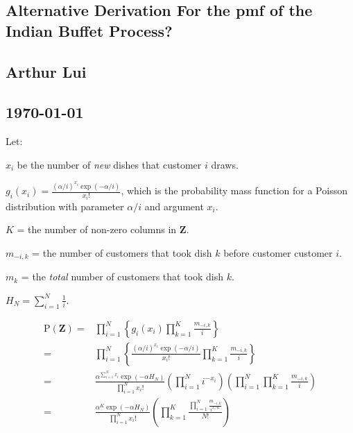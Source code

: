 \documentclass{article}                                                   %
\def\prodl#1#2#3{\prod\limits_{#1=#2}^{#3}}                               %
\def\suml#1#2#3{\sum\limits_{#1=#2}^{#3}}                                 %
\def\ds{\displaystyle}                                                    %
\renewenvironment{itemize}[1]{\begin{compactitem}#1}{\end{compactitem}}
\begin{document}
\begin{center}                                                            %
  \section*{\textbf{Alternative Derivation For the pmf of the 
                    Indian Buffet Process?}}   %
  \subsection*{\textbf{Arthur Lui}}                                       %
  \subsection*{\noindent\today}                                           %
\end{center}                                                              %

\noindent
Let:
\begin{itemize}
  \item $x_i$ be the number of \textit{new} dishes that customer $i$ draws.\\ 
  \item $g_i(x_i) = \ds\frac{(\alpha/i)^{x_i}\exp(-\alpha/i)}{x_i!}$, which is the 
        probability mass function for a Poisson distribution with parameter 
        $\alpha/i$ and argument $x_i$.\\
  \item $K$ = the number of non-zero columns in $\bm Z$.\\
  \item $m_{-i,k}$ = the number of customers that took dish $k$ before customer
        customer $i$.
  \item $m_k$ = the \textit{total} number of customers that took dish $k$.
  \item $H_N = \suml{i}{1}{N} \ds\frac{1}{i}$.
\end{itemize}

\begin{align*}
  \text{P}(\bm Z)
  =&\prodl{i}{1}{N} \left\{g_i(x_i) \prodl{k}{1}{K} \frac{m_{-i,k}}{i}\right\}\\
  =&\prodl{i}{1}{N} \left\{ \ds\frac{(\alpha/i)^{x_i}\exp(-\alpha/i)}{x_i!} 
    \prodl{k}{1}{K} \ds\frac{m_{-i,k}}{i} \right\} \\
  =&\ds\frac{\alpha^{\suml{i}{1}{N}x_i} \exp(-\alpha H_N)} {\prodl{i}{1}{N}x_i!} 
    \left( \prodl{i}{1}{N}i^{-x_i} \right)
    \left( \prodl{i}{1}{N}\prodl{k}{1}{K} \ds\frac{m_{-i,k}}{i} \right)\\
  =&\ds\frac{\alpha^{K} \exp(-\alpha H_N)}{\prodl{i}{1}{N}x_i!}
    \left(\prodl{k}{1}{K}\ds\frac{\prodl{i}{1}{N}\ds\frac{m_{-i,k}}{i^{x_i/K}}}{N!} \right)\\
\end{align*}
\end{document}
